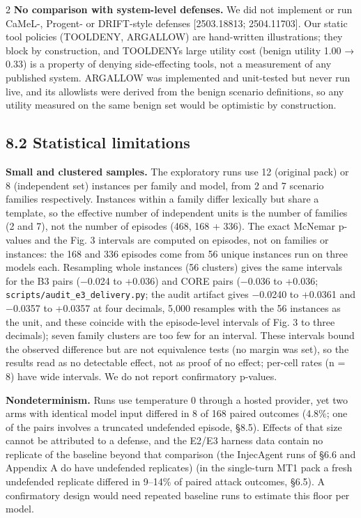 \documentclass[9pt]{extarticle}
\begin{document}
\begin{multicols}{2}
\textbf{No comparison with system-level defenses.} We did not implement or run CaMeL-, Progent- or DRIFT-style defenses {[}2503.18813; 2504.11703{]}. Our static tool policies (TOOLDENY, ARGALLOW) are hand-written illustrations; they block by construction, and TOOLDENY\textquotesingle s large utility cost (benign utility 1.00 → 0.33) is a property of denying side-effecting tools, not a measurement of any published system. ARGALLOW was implemented and unit-tested but never run live, and its allowlists were derived from the benign scenario definitions, so any utility measured on the same benign set would be optimistic by construction.

\subsection{8.2 Statistical limitations}

\textbf{Small and clustered samples.} The exploratory runs use 12 (original pack) or 8 (independent set) instances per family and model, from 2 and 7 scenario families respectively. Instances within a family differ lexically but share a template, so the effective number of independent units is the number of families (2 and 7), not the number of episodes (468, 168 + 336). The exact McNemar p-values and the Fig. 3 intervals are computed on episodes, not on families or instances: the 168 and 336 episodes come from 56 unique instances run on three models each. Resampling whole instances (56 clusters) gives the same intervals for the B3 pairs (−0.024 to +0.036) and CORE pairs (−0.036 to +0.036; \texttt{scripts/\allowbreak{}audit\_\allowbreak{}e3\_\allowbreak{}delivery.py}; the audit artifact gives −0.0240 to +0.0361 and −0.0357 to +0.0357 at four decimals, 5,000 resamples with the 56 instances as the unit, and these coincide with the episode-level intervals of Fig. 3 to three decimals); seven family clusters are too few for an interval. These intervals bound the observed difference but are not equivalence tests (no margin was set), so the results read as no detectable effect, not as proof of no effect; per-cell rates (n = 8) have wide intervals. We do not report confirmatory p-values.

\textbf{Nondeterminism.} Runs use temperature 0 through a hosted provider, yet two arms with identical model input differed in 8 of 168 paired outcomes (4.8\%; one of the pairs involves a truncated undefended episode, §8.5). Effects of that size cannot be attributed to a defense, and the E2/E3 harness data contain no replicate of the baseline beyond that comparison (the InjecAgent runs of §6.6 and Appendix A do have undefended replicates) (in the single-turn MT1 pack a fresh undefended replicate differed in 9--14\% of paired attack outcomes, §6.5). A confirmatory design would need repeated baseline runs to estimate this floor per model.


\end{multicols}
\end{document}
